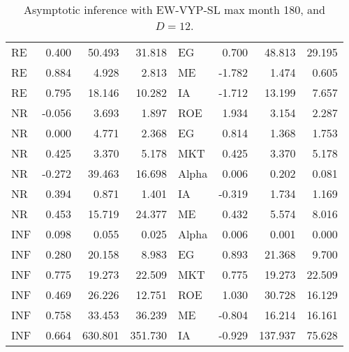 \documentclass[12pt]{article}
\begin{document}
\begin{table}[ht]
\begin{tabular}{lrrrlrrr}
RE & 0.400 & 50.493 & 31.818 & EG & 0.700 & 48.813 & 29.195 \\ 
RE & 0.884 & 4.928 & 2.813 & ME & -1.782 & 1.474 & 0.605 \\ 
RE & 0.795 & 18.146 & 10.282 & IA & -1.712 & 13.199 & 7.657 \\ 
\hline
NR & -0.056 & 3.693 & 1.897 & ROE & 1.934 & 3.154 & 2.287 \\ 
NR & 0.000 & 4.771 & 2.368 & EG & 0.814 & 1.368 & 1.753 \\ 
NR & 0.425 & 3.370 & 5.178 & MKT & 0.425 & 3.370 & 5.178 \\ 
NR & -0.272 & 39.463 & 16.698 & Alpha & 0.006 & 0.202 & 0.081 \\ 
NR & 0.394 & 0.871 & 1.401 & IA & -0.319 & 1.734 & 1.169 \\ 
NR & 0.453 & 15.719 & 24.377 & ME & 0.432 & 5.574 & 8.016 \\ 
\hline
INF & 0.098 & 0.055 & 0.025 & Alpha & 0.006 & 0.001 & 0.000 \\ 
INF & 0.280 & 20.158 & 8.983 & EG & 0.893 & 21.368 & 9.700 \\ 
INF & 0.775 & 19.273 & 22.509 & MKT & 0.775 & 19.273 & 22.509 \\ 
INF & 0.469 & 26.226 & 12.751 & ROE & 1.030 & 30.728 & 16.129 \\ 
INF & 0.758 & 33.453 & 36.239 & ME & -0.804 & 16.214 & 16.161 \\ 
INF & 0.664 & 630.801 & 351.730 & IA & -0.929 & 137.937 & 75.628 \\ 
		\hline
		\hline
	\end{tabular}
	\caption{Asymptotic inference with EW-VYP-SL max month 180, and $D=12$.} 
	\label{tab:ai_180_EW_VYP_SL}
\end{table}
\end{document}
